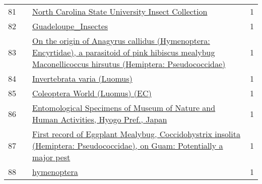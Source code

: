 \begin{longtable}{llp{5in}r}
81 &    &                                                                                                                                                \href{https://www.gbif.org/dataset/e6b15dc0-d70e-446b-bf28-4ddb1a9f4f41}{North Carolina State University Insect Collection} &             1 \\
82 &    &                                                                                                                                                                              \href{https://www.gbif.org/dataset/e4526ee9-1592-4764-8af1-c89621255f82}{Guadeloupe\_Insectes} &             1 \\
83 &    &                                        \href{https://www.gbif.org/dataset/ac9a4b1b-b3d2-4bb0-9ed3-0232012e96c2}{On the origin of Anagyrus callidus (Hymenoptera: Encyrtidae), a parasitoid of pink hibiscus mealybug Maconellicoccus hirsutus (Hemiptera: Pseudococcidae)} &             1 \\
84 &    &                                                                                                                                                                      \href{https://www.gbif.org/dataset/d185ab72-3518-4cb8-b9ad-79010d6eef70}{Invertebrata varia (Luomus)} &             1 \\
85 &    &                                                                                                                                                                   \href{https://www.gbif.org/dataset/0f188bfc-2537-4863-90b7-3b5f856dc87e}{Coleoptera World (Luomus) (EC)} &             1 \\
86 &    &                                                                                                             \href{https://www.gbif.org/dataset/68c30283-d2a7-4742-96cb-52e249598ff9}{Entomological Specimens of Museum of Nature and Human Activities, Hyogo Pref., Japan} &             1 \\
87 &    &                                                                        \href{https://www.gbif.org/dataset/a5262686-e9bc-45b4-8b4f-ec2d2321bb3b}{First record of Eggplant Mealybug, Coccidohystrix insolita (Hemiptera: Pseudococcidae), on Guam: Potentially a major pest} &             1 \\
88 &    &                                                                                                                                                                                      \href{https://www.gbif.org/dataset/e4d3fc77-1d94-495b-96ff-3fe8b8f7a3bd}{hymenoptera} &             1 \\

\end{longtable}
